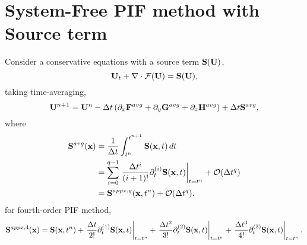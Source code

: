 \section{System-Free PIF method with Source term}\label{sec:sfpif_source}


Consider a conservative equations with a source term \( \mathbf{S}(\mathbf{U}) \),
\begin{equation}\label{eq:sf_source_gov}
    \mathbf{U}_{t} + \nabla \cdot \mathcal{F}(\mathbf{U}) = \mathbf{S}(\mathbf{U}),
\end{equation}
taking time-averaging,
\begin{equation}\label{eq:sf_source_time_average}
    \mathbf{U}^{n + 1} = \mathbf{U}^{n} - \Delta t \left( \partial_{x} \mathbf{F}^{avg} + \partial_{y} \mathbf{G}^{avg} + \partial_{z} \mathbf{H}^{avg} \right)
        + \Delta t \mathbf{S}^{avg},
\end{equation}
where
\begin{equation}\label{eq:sf_source_time_taylor}
    \begin{split}
        \mathbf{S}^{avg} (\mathbf{x})
        &= \frac{1}{\Delta t} \int^{t^{n + 1}}_{t^n} \mathbf{S}(\mathbf{x}, t) \mathop{dt}\\
        &= \sum\limits_{i=0}^{q-1}
            \left.\frac{\Delta t^{i}}{(i+1)!} \partial_{t}^{(i)} \mathbf{S} (\mathbf{x}, t) \right|_{t = t^{n}} + \mathcal{O}(\Delta t^{q}) \\
        &= \mathbf{S}^{appx,q} (\mathbf{x}, t^{n}) + \mathcal{O}(\Delta t^{q}).
    \end{split}
\end{equation}
for fourth-order PIF method,
\begin{equation}\label{eq:sf_source_4order}
    \mathbf{S}^{appx, 4} (\mathbf{x}) = \mathbf{S} (\mathbf{x}, t^{n})
        + \left. \frac{\Delta t}{2!} \partial_{t}^{(1)} \mathbf{S} (\mathbf{x}, t) \right|_{t = t^{n}}
        + \left. \frac{\Delta t^{2}}{3!} \partial_{t}^{(2)} \mathbf{S} (\mathbf{x}, t) \right|_{t = t^{n}}
        + \left. \frac{\Delta t^{3}}{4!} \partial_{t}^{(3)} \mathbf{S} (\mathbf{x}, t) \right|_{t = t^{n}}.
\end{equation}

